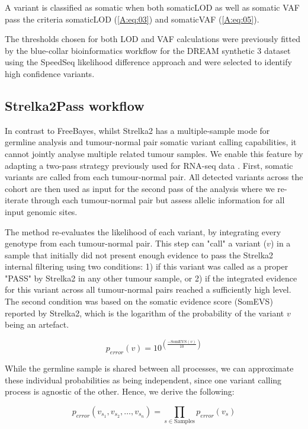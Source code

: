 A variant is classified as somatic when both somaticLOD as well as somatic VAF pass the criteria somaticLOD (\autoref{A:eq:03}) and somaticVAF (\autoref{A:eq:05}).

The thresholds chosen for both LOD and VAF calculations were previously fitted by the blue-collar bioinformatics workflow for the DREAM synthetic 3 dataset using the SpeedSeq likelihood difference approach \parencite{Chapman2020} and were selected to identify high confidence variants.

\subsection{Strelka2Pass workflow}
In contrast to FreeBayes, whilst Strelka2 has a multiple-sample mode for germline analysis and tumour-normal pair somatic variant calling capabilities, it cannot jointly analyse multiple related tumour samples. We enable this feature by adapting a two-pass strategy previously used for RNA-seq data \parencite{Veeneman2015}. First, somatic variants are called from each tumour-normal pair. All detected variants across the cohort are then used as input for the second pass of the analysis where we re-iterate through each tumour-normal pair but assess allelic information for all input genomic sites.

The method re-evaluates the likelihood of each variant, by integrating every genotype from each tumour-normal pair. This step can "call" a variant ($v$) in a sample that initially did not present enough evidence to pass the Strelka2 internal filtering using two conditions: 1) if this variant was called as a proper "PASS" by Strelka2 in any other tumour sample, or 2) if the integrated evidence for this variant across all tumour-normal pairs reached a sufficiently high level. The second condition was based on the somatic evidence score (SomEVS) reported by Strelka2, which is the logarithm of the probability of the variant $v$ being an artefact.

\begin{equation}
p_{error}(v) = 10^{\left( \frac{-\text{SomEVS}(v)}{10} \right)} \label{A:eq:06}
\end{equation}

While the germline sample is shared between all processes, we can approximate these individual probabilities as being independent, since one variant calling process is agnostic of the other. Hence, we derive the following:

\begin{equation}
p_{error}(v_{s_1},v_{s_2},\ldots,v_{s_n}) = \prod_{s \in \text{Samples}} p_{error}(v_{s}) \label{A:eq:07}
\end{equation}

